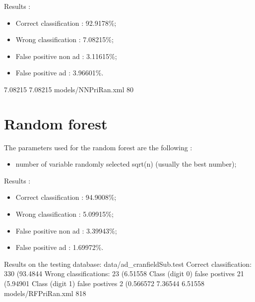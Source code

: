   Results :
  \begin{itemize}
    \item Correct classification : 92.9178\%;
    \item Wrong classification : 7.08215\%;
    \item False positive non ad : 3.11615\%;
    \item False positive ad : 3.96601\%.
  \end{itemize}
  7.08215
  7.08215
  models/NNPriRan.xml
  80

\section{Random forest}
The parameters used for the random forest are the following :
  \begin{itemize}
    \item number of variable randomly selected sqrt(n) (usually the best number);
  \end{itemize}
Results :
\begin{itemize}
  \item Correct classification : 94.9008\%;
  \item Wrong classification : 5.09915\%;
  \item False positive non ad : 3.39943\%;
  \item False positive ad : 1.69972\%.
\end{itemize}

Results on the testing database: data/ad_cranfieldSub.test
	Correct classification: 330 (93.4844%
	Wrong classifications: 23 (6.51558%
	Class (digit 0) false postives 	21 (5.94901%
	Class (digit 1) false postives 	2 (0.566572%
7.36544
6.51558
models/RFPriRan.xml
818
